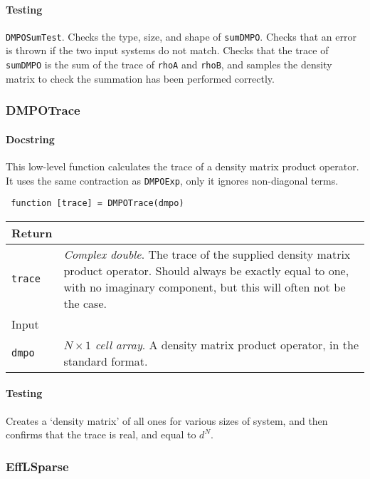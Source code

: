  \paragraph{Testing} \lstinline$DMPOSumTest$. Checks the type, size, and shape of \lstinline$sumDMPO$. Checks that an error is thrown if the two input systems do not match. Checks that the trace of \lstinline$sumDMPO$ is the sum of the trace of \lstinline$rhoA$ and \lstinline$rhoB$, and samples the density matrix to check the summation has been performed correctly.  

 \subsubsection{DMPOTrace}
 \paragraph{Docstring} This low-level function calculates the trace of a density matrix product operator. It uses the same contraction as \lstinline$DMPOExp$, only it ignores non-diagonal terms. 
 \begin{lstlisting}
 function [trace] = DMPOTrace(dmpo) \end{lstlisting}
 \begin{longtabu}{X[1,l]X[4,l]}
 \hline
 Return & \\ \hline
 \lstinline$trace$ & \emph{Complex double}. The trace of the supplied density matrix product operator. Should always be exactly equal to one, with no imaginary component, but this will often not be the case. \\ \hline
 Input & \\ \hline
 \lstinline$dmpo$ & \emph{\(N \times 1\) cell array}. A density matrix product operator, in the standard format. \\
 \hline
 \end{longtabu}
 \paragraph{Testing} Creates a `density matrix' of all ones for various sizes of system, and then confirms that the trace is real, and equal to \(d^{N}\). 

 \subsubsection{EffLSparse}
